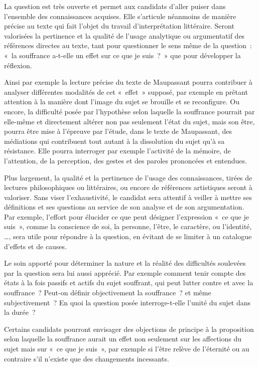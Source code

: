 {La question est très ouverte et permet aux candidats d'aller puiser dans
l'ensemble des connaissances acquises. Elle s'articule néanmoins de manière
précise au texte qui fait l'objet du travail d'interprétation littéraire. Seront valorisées la
pertinence et la qualité de l'usage analytique ou argumentatif des références directes
au texte, tant pour questionner le sens même de la question~: «~la souffrance a-t-elle
un effet sur ce que je suis~?~» que pour développer la réflexion.

Ainsi par exemple la lecture précise du texte de Maupassant pourra contribuer
à analyser différentes modalités de cet «~effet~» supposé, par exemple en prêtant
attention à la manière dont l'image du sujet se brouille et se reconfigure. Ou encore,
la difficulté posée par l'hypothèse selon laquelle la souffrance pourrait par elle-même
et directement altérer non pas seulement l'état du sujet, mais son être, pourra être
mise à l'épreuve par l'étude, dans le texte de Maupassant, des médiations qui
contribuent tout autant à la dissolution du sujet qu'à sa résistance. Elle pourra
interroger par exemple l'activité de la mémoire, de l'attention, de la perception, des
gestes et des paroles prononcées et entendues.

Plus largement, la qualité et la pertinence de l'usage des connaissances,
tirées de lectures philosophiques ou littéraires, ou encore de références artistiques
seront à valoriser. Sans viser l'exhaustivité, le candidat sera attentif à veiller à mettre
ses définitions et ses questions au service de son analyse et de son argumentation.
Par exemple, l'effort pour élucider ce que peut désigner l'expression «~ce que je
suis~», comme la conscience de soi, la personne, l'être, le caractère, ou l'identité, \dots\xspace{},
sera utile pour répondre à la question, en évitant de se limiter à un catalogue d'effets
et de causes.

Le soin apporté pour déterminer la nature et la réalité des difficultés soulevées
par la question sera lui aussi apprécié. Par exemple comment tenir compte des états
à la fois passifs et actifs du sujet souffrant, qui peut lutter contre et avec la
souffrance~? Peut-on définir objectivement la souffrance~? et même subjectivement~?
En quoi la question posée interroge-t-elle l'unité du sujet dans la durée~?

Certains candidats pourront envisager des objections de principe à la
proposition selon laquelle la souffrance aurait un effet non seulement sur les
affections du sujet mais sur «~ce que je suis~», par exemple si l'être relève de
l'éternité ou au contraire s'il n'existe que des changements incessants.

}
